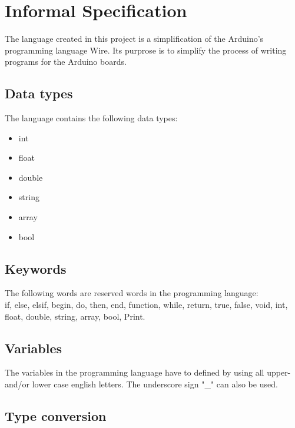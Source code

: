 \section{Informal Specification}

The language created in this project is a simplification of the Arduino's programming language Wire. Its purprose is to simplify the process of writing programs for the Arduino boards.   

\subsection{Data types}
The language contains the following data types: 
\begin{itemize}
\item int
\item float
\item double
\item string
\item array
\item bool
\end{itemize}

\subsection{Keywords}
The following words are reserved words in the programming language:\\
if, else, elsif, begin, do, then, end, function, while, return, true, false, void, int, float, double, string, array, bool, Print.

\subsection{Variables}
The variables in the programming language have to defined by using all upper- and/or lower case english letters. The underscore sign "\_" can also be used. 

\subsection{Type conversion}
